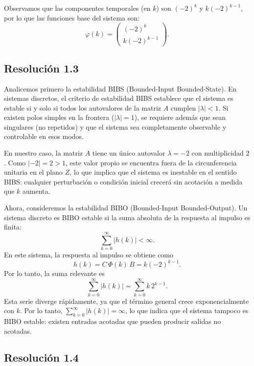 \documentclass[
  11pt,
  letterpaper,
   addpoints,
  answers
  ]{exam}
\begin{document}
\begin{questions}
\begin{solution}
Observamos que las componentes temporales (en $k$) son $(-2)^{k}$ y $k(-2)^{k-1}$, por lo que las funciones base del sistema son:
\begin{equation}
\varphi(k) =
\begin{pmatrix}
(-2)^{k} \\
k(-2)^{k-1}
\end{pmatrix}.
\end{equation}

\subsection*{Resolución 1.3}


Analicemos primero la estabilidad BIBS (Bounded-Input Bounded-State). En sistemas discretos, el criterio de estabilidad BIBS establece que el sistema es estable si y solo si todos los autovalores de la matriz $A$ cumplen $|\lambda| < 1$. Si existen polos simples en la frontera ($|\lambda| = 1$), se requiere además que sean singulares (no repetidos) y que el sistema sea completamente observable y controlable en esos modos.

En nuestro caso, la matriz $A$ tiene un único autovalor $\lambda = -2$ con multiplicidad $2$. Como $|-2| = 2 > 1$, este valor propio se encuentra fuera de la circunferencia unitaria en el plano $Z$, lo que implica que el sistema es inestable en el sentido BIBS: cualquier perturbación o condición inicial crecerá sin acotación a medida que $k$ aumenta.

Ahora, consideremos la estabilidad BIBO (Bounded-Input Bounded-Output). Un sistema discreto es BIBO estable si la suma absoluta de la respuesta al impulso es finita:
\begin{equation}
\sum_{k=0}^{\infty} |h(k)| < \infty.
\end{equation}
En este sistema, la respuesta al impulso se obtiene como
\begin{equation}
h(k) = C\,\Phi(k)\,B = k(-2)^{k-1}.
\end{equation}
Por lo tanto, la suma relevante es
\begin{equation}
\sum_{k=0}^{\infty} |h(k)| = \sum_{k=0}^{\infty} k\,2^{k-1}.
\end{equation}
Esta serie diverge rápidamente, ya que el término general crece exponencialmente con $k$. Por lo tanto, $\sum_{k=0}^{\infty} |h(k)| = \infty$, lo que indica que el sistema tampoco es BIBO estable: existen entradas acotadas que pueden producir salidas no acotadas.

\subsection*{Resolución 1.4}


\end{solution}
\end{questions}
\end{document}
